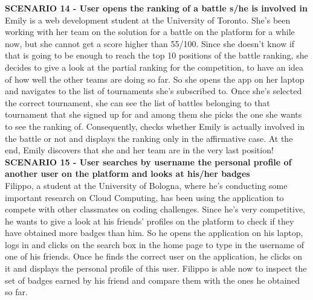     \textbf{SCENARIO 14 - User opens the ranking of a battle s/he is involved in}\\
     Emily is a web development student at the University of Toronto. She's been working with her team on the solution for a battle on the \app platform for a while now, but she cannot get a score higher than 55/100. Since she doesn't know if that is going to be enough to reach the top 10 positions of the battle ranking, she decides to give a look at the partial ranking for the competition, to have an idea of how well the other teams are doing so far. So she opens the \app app on her laptop and navigates to the list of tournaments she's subscribed to. Once she's selected the correct tournament, she can see the list of battles belonging to that tournament that she signed up for and among them she picks the one she wants to see the ranking of. Consequently, \app checks whether Emily is actually involved in the battle or not and displays the ranking only in the affirmative case. 
     At the end, Emily discovers that she and her team are in the very last position!\\

    \textbf{SCENARIO 15 - User searches by username the personal profile of another user on the platform and looks at his/her badges}\\
    Filippo, a student at the University of Bologna, where he's conducting some important research on Cloud Computing, has been using the \app application to compete with other classmates on coding challenges. Since he's very competitive, he wants to give a look at his friends' profiles on the platform to check if they have obtained more badges than him. So he opens the \app application on his laptop, logs in and clicks on the search box in the home page to type in the username of one of his friends. Once he finds the correct user on the application, he clicks on it and \app displays the personal profile of this user. Filippo is able now to inspect the set of badges earned by his friend and compare them with the ones he obtained so far.\\